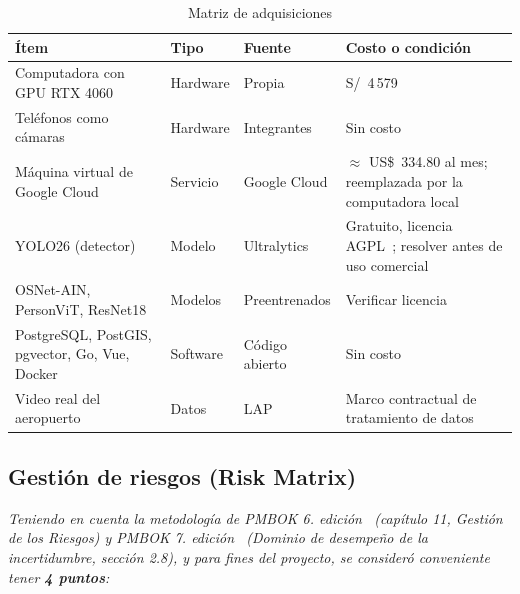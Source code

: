 \documentclass[12pt,a4paper]{article}
\begin{document}
\begin{table}[H]
\centering
\caption{Matriz de adquisiciones}
\label{tab:adquisiciones}
\footnotesize
\renewcommand{\arraystretch}{1.15}
\begin{tabular}{|L{0.25\textwidth}|L{0.14\textwidth}|L{0.18\textwidth}|L{0.27\textwidth}|}
\hline
\textbf{Ítem} & \textbf{Tipo} & \textbf{Fuente} & \textbf{Costo o condición} \\
\hline
Computadora con GPU RTX 4060 & Hardware & Propia & S/~4\,579~\cite{promart-pc} \\
\hline
Teléfonos como cámaras & Hardware & Integrantes & Sin costo \\
\hline
Máquina virtual de Google Cloud & Servicio & Google Cloud & $\approx$ US\$~334.80 al mes; reemplazada por la computadora local \\
\hline
YOLO26 (detector) & Modelo & Ultralytics & Gratuito, licencia AGPL~\cite{ultralytics-licencia}; resolver antes de uso comercial \\
\hline
OSNet-AIN, PersonViT, ResNet18 & Modelos & Preentrenados & Verificar licencia \\
\hline
PostgreSQL, PostGIS, pgvector, Go, Vue, Docker & Software & Código abierto & Sin costo \\
\hline
Video real del aeropuerto & Datos & LAP & Marco contractual de tratamiento de datos \\
\hline
\end{tabular}
\end{table}

\subsection{Gestión de riesgos (Risk Matrix)}
\label{sec:riesgos}

\textit{Teniendo en cuenta la metodología de PMBOK 6.\textordfeminine{} edición~\cite{pmbok6}
(capítulo 11, Gestión de los Riesgos) y PMBOK 7.\textordfeminine{} edición~\cite{pmbok7}
(Dominio de desempeño de la incertidumbre, sección 2.8), y para fines del proyecto, se consideró conveniente tener
\textbf{4 puntos}:}
\end{document}

